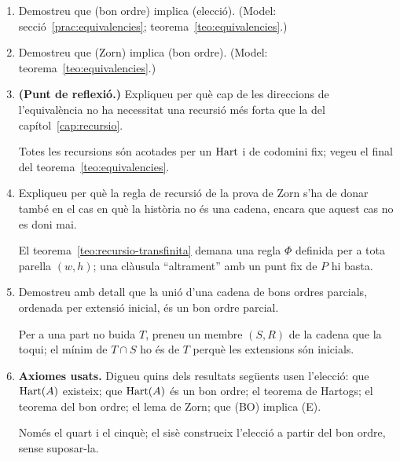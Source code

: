 \begin{enumerate}[resume]
  \item Demostreu que (bon ordre) implica (elecció). (Model: secció~\ref{prac:equivalencies}; teorema~\ref{teo:equivalencies}.)

  \item Demostreu que (Zorn) implica (bon ordre). (Model: teorema~\ref{teo:equivalencies}.)

  \item \textbf{(Punt de reflexió.)} Expliqueu per què cap de les direccions de l'equivalència no ha necessitat una recursió més forta que la del capítol~\ref{cap:recursio}. \begin{indicacio}Totes les recursions són acotades per un \(\operatorname{Hart}\) i de codomini fix; vegeu el final del teorema~\ref{teo:equivalencies}.\end{indicacio}

  \item Expliqueu per què la regla de recursió de la prova de Zorn s'ha de donar també en el cas en què la història no és una cadena, encara que aquest cas no es doni mai. \begin{indicacio}El teorema~\ref{teo:recursio-transfinita} demana una regla \(\Phi\) definida per a tota parella \((w,h)\); una clàusula \enquote{altrament} amb un punt fix de \(P\) hi basta.\end{indicacio}

  \item Demostreu amb detall que la unió d'una cadena de bons ordres parcials, ordenada per extensió inicial, és un bon ordre parcial. \begin{indicacio}Per a una part no buida \(T\), preneu un membre \((S,R)\) de la cadena que la toqui; el mínim de \(T\cap S\) ho és de \(T\) perquè les extensions són inicials.\end{indicacio}

  \item \textbf{Axiomes usats.} Digueu quins dels resultats següents usen l'elecció: que \(\operatorname{Hart}(A)\) existeix; que \(\operatorname{Hart}(A)\) és un bon ordre; el teorema de Hartogs; el teorema del bon ordre; el lema de Zorn; que (BO) implica (E). \begin{indicacio}Només el quart i el cinquè; el sisè construeix l'elecció a partir del bon ordre, sense suposar-la.\end{indicacio}
\end{enumerate}
